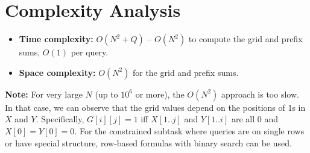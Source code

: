 \documentclass[11pt,a4paper]{article}
\begin{document}
\section{Complexity Analysis}
\begin{itemize}
  \item \textbf{Time complexity:} $O(N^2 + Q)$ -- $O(N^2)$ to compute the grid and prefix sums, $O(1)$ per query.
  \item \textbf{Space complexity:} $O(N^2)$ for the grid and prefix sums.
\end{itemize}

\textbf{Note:} For very large $N$ (up to $10^6$ or more), the $O(N^2)$ approach is too slow. In that case, we can observe that the grid values depend on the positions of 1s in $X$ and $Y$. Specifically, $G[i][j] = 1$ iff $X[1..j]$ and $Y[1..i]$ are all 0 and $X[0] = Y[0] = 0$. For the constrained subtask where queries are on single rows or have special structure, row-based formulas with binary search can be used.
\end{document}
